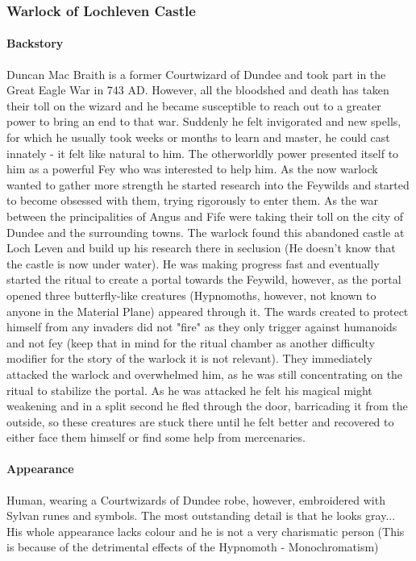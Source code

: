 \subsubsection*{Warlock of Lochleven Castle}
{\entryfont \paragraph*{Backstory} Duncan Mac Braith is a former Courtwizard of Dundee and took part in the Great Eagle War in 743 AD. However, all the bloodshed and death has taken their toll on the wizard and he became susceptible to reach out to a greater power to bring an end to that war. Suddenly he felt invigorated and new spells, for which he usually took weeks or months to learn and master, he could cast innately - it felt like natural to him. The otherworldly power presented itself to him as a powerful Fey who was interested to help him. As the now warlock wanted to gather more strength he started research into the Feywilds and started to become obsessed with them, trying rigorously to enter them. As the war between the principalities of Angus and Fife were taking their toll on the city of Dundee and the surrounding towns. The warlock found this abandoned castle at Loch Leven and build up his research there in seclusion (He doesn't know that the castle is now under water). He was making progress fast and eventually started the ritual to create a portal towards the Feywild, however, as the portal opened three butterfly-like creatures (Hypnomoths, however, not known to anyone in the Material Plane) appeared through it. The wards created to protect himself from any invaders did not "fire" as they only trigger against humanoids and not fey (keep that in mind for the ritual chamber as another difficulty modifier for the story of the warlock it is not relevant). They immediately attacked the warlock and overwhelmed him, as he was still concentrating on the ritual to stabilize the portal. As he was attacked he felt his magical might weakening and in a split second he fled through the door, barricading it from the outside, so these creatures are stuck there until he felt better and recovered to either face them himself or find some help from mercenaries. 

\paragraph*{Appearance} Human, wearing a Courtwizards of Dundee robe, however, embroidered with Sylvan runes and symbols. The most outstanding detail is that he looks gray... His whole appearance lacks colour and he is not a very charismatic person (This is because of the detrimental effects of the Hypnomoth - Monochromatism)

}
